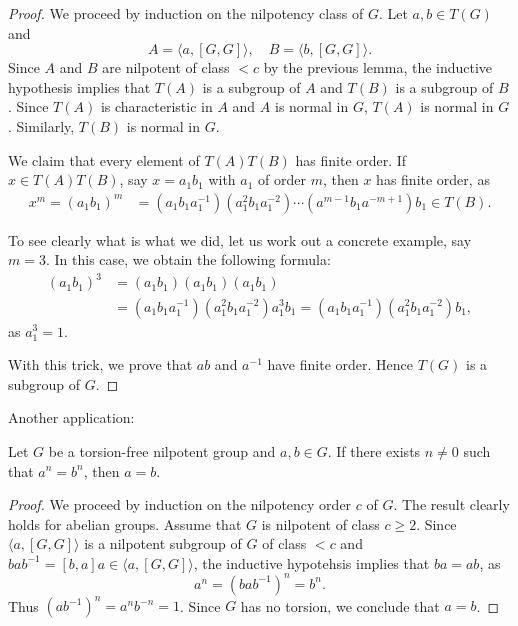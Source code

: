 \begin{proof}
We proceed by induction on the nilpotency class of $G$. 
Let $a,b\in T(G)$ and 
\[
	A=\langle a,[G,G]\rangle,\quad
	B=\langle b,[G,G]\rangle.
\]
Since  $A$ and $B$ are nilpotent of class $<c$ by the previous lemma, 
the inductive hypothesis 
implies that $T(A)$ is a subgroup of $A$ and $T(B)$ is a subgroup of $B$.
Since $T(A)$ is characteristic in $A$ and $A$ is normal in $G$, $T(A)$ is normal in $G$. 
Similarly, $T(B)$ is normal in $G$. 

We claim that every element of 
$T(A)T(B)$ has finite order. If 
$x\in T(A)T(B)$, say $x=a_1b_1$ with
$a_1$ of order $m$, then $x$ has finite order, as 
\begin{align*}
x^m=(a_1b_1)^m&=%
(a_1b_1a_1^{-1})(a_1^2b_1a_1^{-2})\cdots (a^{m-1} b_1 a^{-m+1})b_1\in T(B).
\end{align*}

To see clearly what is what we did, let us work out a concrete 
example, say $m=3$. In this case, we obtain the following formula:
\begin{align*}
(a_1b_1)^3&=(a_1b_1)(a_1b_1)(a_1b_1)\\
&=(a_1b_1a_1^{-1})(a_1^2b_1a_1^{-2})a_1^3b_1
=(a_1b_1a_1^{-1})(a_1^2b_1a_1^{-2})b_1,
\end{align*}
as $a_1^3=1$.

With this trick, we prove that $ab$ and $a^{-1}$ have finite order. Hence $T(G)$ 
is a subgroup of $G$. 
\end{proof}

Another application:

\begin{theorem}
\label{thm:a=b}
Let $G$ be a torsion-free nilpotent group and $a,b\in G$. If there exists 
$n\ne 0$ such that $a^n=b^n$, then $a=b$.
\end{theorem}

\begin{proof}
We proceed by induction on the nilpotency order $c$ of $G$. 
The result clearly holds for abelian groups. Assume that $G$ is nilpotent of class $c\geq2$. 
Since $\langle a,[G,G]\rangle$ is a nilpotent subgroup of $G$ of class $<c$
and $bab^{-1}=[b,a]a\in \langle
a,[G,G]\rangle$, the inductive hypotehsis implies that 
$ba=ab$, as 
\[
	a^n=(bab^{-1})^n=b^n.
\]
Thus $(ab^{-1})^n=a^nb^{-n}=1$. Since $G$ has no torsion, we conclude that 
$a=b$.
\end{proof}

